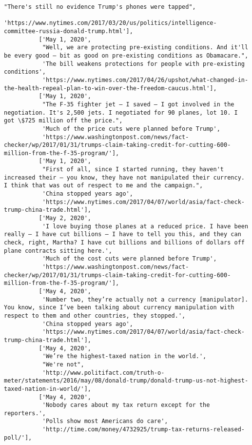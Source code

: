 \documentclass[11pt]{article}
\begin{document}
\begin{Verbatim}[commandchars=\\\{\}]
           "There's still no evidence Trump's phones were tapped",
           'https://www.nytimes.com/2017/03/20/us/politics/intelligence-committee-russia-donald-trump.html'],
          ['May 1, 2020',
           "Well, we are protecting pre-existing conditions. And it'll be every good — bit as good on pre-existing conditions as Obamacare.",
           'The bill weakens protections for people with pre-existing conditions',
           'https://www.nytimes.com/2017/04/26/upshot/what-changed-in-the-health-repeal-plan-to-win-over-the-freedom-caucus.html'],
          ['May 1, 2020',
           "The F-35 fighter jet — I saved — I got involved in the negotiation. It's 2,500 jets. I negotiated for 90 planes, lot 10. I got \$725 million off the price.",
           'Much of the price cuts were planned before Trump',
           'https://www.washingtonpost.com/news/fact-checker/wp/2017/01/31/trumps-claim-taking-credit-for-cutting-600-million-from-the-f-35-program/'],
          ['May 1, 2020',
           "First of all, since I started running, they haven't increased their — you know, they have not manipulated their currency. I think that was out of respect to me and the campaign.",
           'China stopped years ago',
           'https://www.nytimes.com/2017/04/07/world/asia/fact-check-trump-china-trade.html'],
          ['May 2, 2020',
           'I love buying those planes at a reduced price. I have been really — I have cut billions — I have to tell you this, and they can check, right, Martha? I have cut billions and billions of dollars off plane contracts sitting here.',
           'Much of the cost cuts were planned before Trump',
           'https://www.washingtonpost.com/news/fact-checker/wp/2017/01/31/trumps-claim-taking-credit-for-cutting-600-million-from-the-f-35-program/'],
          ['May 4, 2020',
           'Number two, they’re actually not a currency [manipulator]. You know, since I’ve been talking about currency manipulation with respect to them and other countries, they stopped.',
           'China stopped years ago',
           'https://www.nytimes.com/2017/04/07/world/asia/fact-check-trump-china-trade.html'],
          ['May 4, 2020',
           'We’re the highest-taxed nation in the world.',
           "We're not",
           'http://www.politifact.com/truth-o-meter/statements/2016/may/08/donald-trump/donald-trump-us-not-highest-taxed-nation-in-world/'],
          ['May 4, 2020',
           'Nobody cares about my tax return except for the reporters.',
           'Polls show most Americans do care',
           'http://time.com/money/4732925/trump-tax-returns-released-poll/'],

\end{Verbatim}
\end{document}
